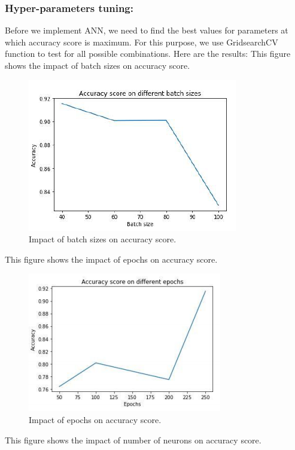 \subsubsection{Hyper-parameters tuning:}

Before we implement ANN, we need to find the best values for parameters at which accuracy score is maximum. For this purpose, we use GridsearchCV function to test for all possible combinations. Here are the results:
This figure shows the impact of batch sizes on accuracy score.


\begin{figure}[h]
  		\centering
    		\includegraphics[scale=0.95]{./Figures/annbs}
\caption{Impact of batch sizes on accuracy score.
}
\label{fig:8}
 		\end{figure}
\clearpage
This figure shows the impact of epochs on accuracy score.

\begin{figure}[h]
  		\centering
    		\includegraphics[scale=1.0]{./Figures/epochs}
\caption{Impact of epochs on accuracy score.}
\label{fig:9}
 		\end{figure}
This figure shows the impact of number of neurons on accuracy score.

